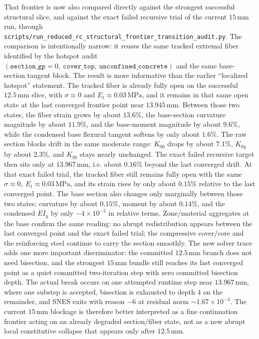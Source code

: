 That frontier is now also compared directly against the strongest successful
structural slice, and against the exact failed recursive trial of the current
\(15\,\mathrm{mm}\) run, through
\texttt{scripts/run\_reduced\_rc\_structural\_frontier\_transition\_audit.py}.
The comparison is intentionally narrow: it reuses the same tracked extremal
fiber identified by the hotspot audit
\((\texttt{section\_gp}=0,\ \texttt{cover\_top},\ \texttt{unconfined\_concrete})\)
and the same base-section tangent block.  The result is more informative than
the earlier ``localized hotspot'' statement.  The tracked fiber is already
fully open on the successful \(12.5\,\mathrm{mm}\) slice, with
\(\sigma \approx 0\) and \(E_t \approx 0.03\,\mathrm{MPa}\), and it remains in
that same open state at the last converged frontier point near
\(13.945\,\mathrm{mm}\).  Between those two states, the fiber strain grows by
about \(13.6\%\), the base-section curvature magnitude by about \(11.9\%\),
and the base-moment magnitude by about \(9.6\%\), while the condensed base
flexural tangent softens by only about \(1.6\%\).  The raw section blocks
drift in the same moderate range: \(K_{00}\) drops by about \(7.1\%\),
\(K_{0y}\) by about \(2.3\%\), and \(K_{yy}\) stays nearly unchanged.  The
exact failed recursive target then sits only at \(13.967\,\mathrm{mm}\), i.e.
about \(0.16\%\) beyond the last converged drift.  At that exact failed trial,
the tracked fiber still remains fully open with the same
\(\sigma \approx 0,\ E_t \approx 0.03\,\mathrm{MPa}\), and its strain rises by
only about \(0.15\%\) relative to the last converged point.  The base section
also changes only marginally between those two states: curvature by about
\(0.15\%\), moment by about \(0.14\%\), and the condensed \(EI_y\) by only
\(-4\times 10^{-5}\) in relative terms.  Zone/material aggregates at the base
confirm the same reading: no abrupt redistribution appears between the last
converged point and the exact failed trial; the compressive cover/core and the
reinforcing steel continue to carry the section smoothly.  The new solver
trace adds one more important discriminator: the committed
\(12.5\,\mathrm{mm}\) branch does not need bisection, and the strongest
\(15\,\mathrm{mm}\) bundle still reaches its last converged point as a quiet
committed two-iteration step with zero committed bisection depth.  The actual
break occurs on one attempted runtime step near \(13.967\,\mathrm{mm}\), where
one substep is accepted, bisection is exhausted to depth \(4\) on the
remainder, and SNES exits with reason \(-6\) at residual norm
\(\sim 1.67\times10^{-3}\).  The current \(15\,\mathrm{mm}\) blockage is
therefore better interpreted as a fine continuation frontier acting on an
already degraded section/fiber state, not as a new abrupt local constitutive
collapse that appears only after \(12.5\,\mathrm{mm}\).

